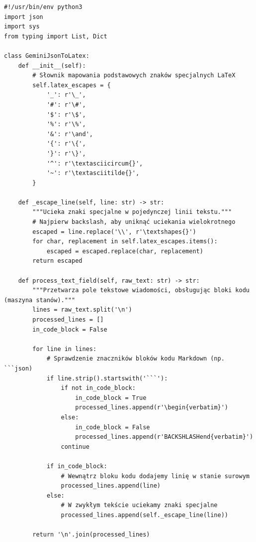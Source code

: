 \documentclass[10pt,a4paper]{article}
\begin{document}
\begin{verbatim}
#!/usr/bin/env python3
import json
import sys
from typing import List, Dict

class GeminiJsonToLatex:
    def __init__(self):
        # Słownik mapowania podstawowych znaków specjalnych LaTeX
        self.latex_escapes = {
            '_': r'\_', 
            '#': r'\#', 
            '$': r'\$', 
            '%': r'\%', 
            '&': r'\and', 
            '{': r'\{', 
            '}': r'\}', 
            '^': r'\textasciicircum{}', 
            '~': r'\textasciitilde{}', 
        }

    def _escape_line(self, line: str) -> str:
        """Ucieka znaki specjalne w pojedynczej linii tekstu."""
        # Najpierw backslash, aby uniknąć uciekania wielokrotnego
        escaped = line.replace('\\', r'\textshapes{}')
        for char, replacement in self.latex_escapes.items():
            escaped = escaped.replace(char, replacement)
        return escaped

    def process_text_field(self, raw_text: str) -> str:
        """Przetwarza pole tekstowe wiadomości, obsługując bloki kodu (maszyna stanów)."""
        lines = raw_text.split('\n')
        processed_lines = []
        in_code_block = False

        for line in lines:
            # Sprawdzenie znaczników bloków kodu Markdown (np. ```json)
            if line.strip().startswith('```'):
                if not in_code_block:
                    in_code_block = True
                    processed_lines.append(r'\begin{verbatim}')
                else:
                    in_code_block = False
                    processed_lines.append(r'BACKSHLASHend{verbatim}')
                continue

            if in_code_block:
                # Wewnątrz bloku kodu dodajemy linię w stanie surowym
                processed_lines.append(line)
            else:
                # W zwykłym tekście uciekamy znaki specjalne
                processed_lines.append(self._escape_line(line))

        return '\n'.join(processed_lines)


\end{verbatim}
\end{document}

